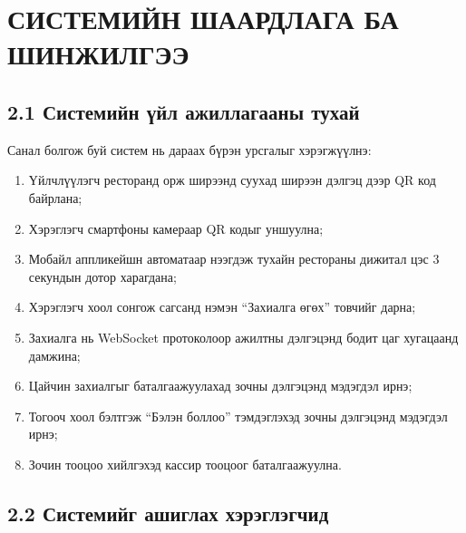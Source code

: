\chapter{СИСТЕМИЙН ШААРДЛАГА БА ШИНЖИЛГЭЭ}
\label{Chapter2}
\pagecolor{white}

\section{2.1 Системийн үйл ажиллагааны тухай}

Санал болгож буй систем нь дараах бүрэн урсгалыг хэрэгжүүлнэ:

\begin{enumerate}
    \item Үйлчлүүлэгч ресторанд орж ширээнд суухад ширээн дэлгэц дээр QR код байрлана;
    \item Хэрэглэгч смартфоны камераар QR кодыг уншуулна;
    \item Мобайл аппликейшн автоматаар нээгдэж тухайн рестораны дижитал цэс 3 секундын
          дотор харагдана;
    \item Хэрэглэгч хоол сонгож сагсанд нэмэн ``Захиалга өгөх'' товчийг дарна;
    \item Захиалга нь WebSocket протоколоор ажилтны дэлгэцэнд бодит цаг хугацаанд дамжина;
    \item Цайчин захиалгыг баталгаажуулахад зочны дэлгэцэнд мэдэгдэл ирнэ;
    \item Тогооч хоол бэлтгэж ``Бэлэн боллоо'' тэмдэглэхэд зочны дэлгэцэнд мэдэгдэл ирнэ;
    \item Зочин тооцоо хийлгэхэд кассир тооцоог баталгаажуулна.
\end{enumerate}

\section{2.2 Системийг ашиглах хэрэглэгчид}

